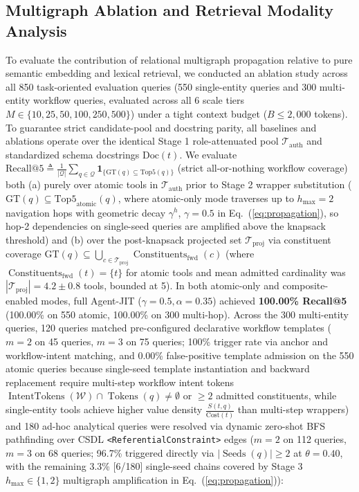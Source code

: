 \documentclass[conference,10pt]{IEEEtran}
\begin{document}
\subsection{Multigraph Ablation and Retrieval Modality Analysis}
To evaluate the contribution of relational multigraph propagation relative to pure semantic embedding and lexical retrieval, we conducted an ablation study across all 850 task-oriented evaluation queries (550 single-entity queries and 300 multi-entity workflow queries, evaluated across all 6 scale tiers $M \in \{10, 25, 50, 100, 250, 500\}$) under a tight context budget ($B \le 2{,}000$ tokens). To guarantee strict candidate-pool and docstring parity, all baselines and ablations operate over the identical Stage 1 role-attenuated pool $\mathcal{T}_{\text{auth}}$ and standardized schema docstrings $\text{Doc}(t)$. We evaluate $\text{Recall@5} \triangleq \frac{1}{|\mathcal{Q}|} \sum_{q \in \mathcal{Q}} \mathbf{1}_{\{\text{GT}(q) \subseteq \text{Top5}(q)\}}$ (strict all-or-nothing workflow coverage) both (a) purely over atomic tools in $\mathcal{T}_{\text{auth}}$ prior to Stage 2 wrapper substitution ($\text{GT}(q) \subseteq \text{Top5}_{\text{atomic}}(q)$, where atomic-only mode traverses up to $h_{\max}=2$ navigation hops with geometric decay $\gamma^h$, $\gamma=0.5$ in Eq.~(\ref{eq:propagation}), so hop-2 dependencies on single-seed queries are amplified above the knapsack threshold) and (b) over the post-knapsack projected set $\mathcal{T}_{\text{proj}}$ via constituent coverage $\text{GT}(q) \subseteq \bigcup_{c \in \mathcal{T}_{\text{proj}}} \operatorname{Constituents}_{\text{fwd}}(c)$ (where $\operatorname{Constituents}_{\text{fwd}}(t) = \{t\}$ for atomic tools and mean admitted cardinality was $|\mathcal{T}_{\text{proj}}| = 4.2 \pm 0.8$ tools, bounded at 5). In both atomic-only and composite-enabled modes, full Agent-JIT ($\gamma=0.5, \alpha=0.35$) achieved \textbf{100.00\% Recall@5} (100.00\% on 550 atomic, 100.00\% on 300 multi-hop). Across the 300 multi-entity queries, 120 queries matched pre-configured declarative workflow templates ($m=2$ on 45 queries, $m=3$ on 75 queries; 100\% trigger rate via anchor and workflow-intent matching, and 0.00\% false-positive template admission on the 550 atomic queries because single-seed template instantiation and backward replacement require multi-step workflow intent tokens $\operatorname{IntentTokens}(\mathcal{W}) \cap \operatorname{Tokens}(q) \neq \emptyset$ or $\ge 2$ admitted constituents, while single-entity tools achieve higher value density $\frac{S(t,q)}{\text{Cost}(t)}$ than multi-step wrappers) and 180 ad-hoc analytical queries were resolved via dynamic zero-shot BFS pathfinding over CSDL \texttt{<ReferentialConstraint>} edges ($m=2$ on 112 queries, $m=3$ on 68 queries; 96.7\% triggered directly via $|\operatorname{Seeds}(q)| \ge 2$ at $\theta = 0.40$, with the remaining 3.3\% [6/180] single-seed chains covered by Stage 3 $h_{\max} \in \{1, 2\}$ multigraph amplification in Eq.~(\ref{eq:propagation})):
\end{document}
